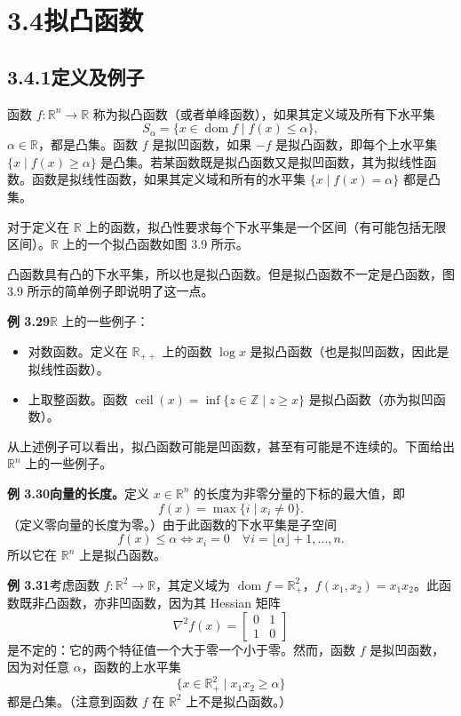 \documentclass[UTF8,12pt,a4paper,fontset=fandol]{ctexart}
\DeclareMathOperator{\dom}{dom}
\begin{document}
\section*{3.4\quad 拟凸函数}

\subsection*{3.4.1\quad 定义及例子}

函数 $f:\mathbb{R}^n\to\mathbb{R}$ 称为拟凸函数（或者单峰函数），如果其定义域及所有下水平集
\[
S_\alpha=\{x\in\dom f\mid f(x)\leq\alpha\},
\]
$\alpha\in\mathbb{R}$，都是凸集。函数 $f$ 是拟凹函数，如果 $-f$ 是拟凸函数，即每个上水平集 $\{x\mid f(x)\geq\alpha\}$ 是凸集。若某函数既是拟凸函数又是拟凹函数，其为拟线性函数。函数是拟线性函数，如果其定义域和所有的水平集 $\{x\mid f(x)=\alpha\}$ 都是凸集。

对于定义在 $\mathbb{R}$ 上的函数，拟凸性要求每个下水平集是一个区间（有可能包括无限区间）。$\mathbb{R}$ 上的一个拟凸函数如图 3.9 所示。

凸函数具有凸的下水平集，所以也是拟凸函数。但是拟凸函数不一定是凸函数，图 3.9 所示的简单例子即说明了这一点。

\noindent\textbf{例 3.29}\quad $\mathbb{R}$ 上的一些例子：
\begin{itemize}
\item 对数函数。定义在 $\mathbb{R}_{++}$ 上的函数 $\log x$ 是拟凸函数（也是拟凹函数，因此是拟线性函数）。
\item 上取整函数。函数 $\operatorname{ceil}(x)=\inf\{z\in\mathbb{Z}\mid z\geq x\}$ 是拟凸函数（亦为拟凹函数）。
\end{itemize}

从上述例子可以看出，拟凸函数可能是凹函数，甚至有可能是不连续的。下面给出 $\mathbb{R}^n$ 上的一些例子。

\noindent\textbf{例 3.30\quad 向量的长度。}\quad 定义 $x\in\mathbb{R}^n$ 的长度为非零分量的下标的最大值，即
\[
f(x)=\max\{i\mid x_i\neq0\}.
\]
（定义零向量的长度为零。）由于此函数的下水平集是子空间
\[
f(x)\leq\alpha\Longleftrightarrow x_i=0\quad \forall i=\lfloor\alpha\rfloor+1,\ldots,n.
\]
所以它在 $\mathbb{R}^n$ 上是拟凸函数。

\noindent\textbf{例 3.31}\quad 考虑函数 $f:\mathbb{R}^2\to\mathbb{R}$，其定义域为 $\dom f=\mathbb{R}_+^2$，$f(x_1,x_2)=x_1x_2$。此函数既非凸函数，亦非凹函数，因为其 Hessian 矩阵
\[
\nabla^2 f(x)=
\begin{bmatrix}
0 & 1\\
1 & 0
\end{bmatrix}
\]
是不定的：它的两个特征值一个大于零一个小于零。然而，函数 $f$ 是拟凹函数，因为对任意 $\alpha$，函数的上水平集
\[
\{x\in\mathbb{R}_+^2\mid x_1x_2\geq\alpha\}
\]
都是凸集。（注意到函数 $f$ 在 $\mathbb{R}^2$ 上不是拟凸函数。）
\end{document}
